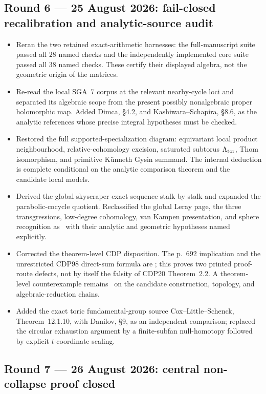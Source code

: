 \subsection*{Round 6 --- 25 August 2026: fail-closed recalibration and
analytic-source audit}

\begin{itemize}[leftmargin=1.8em]
\item Reran the two retained exact-arithmetic harnesses: the
full-manuscript suite passed all $28$ named checks and the independently
implemented core suite passed all $38$ named checks.  These certify their
displayed algebra, not the geometric origin of the matrices.
\item Re-read the local SGA~7 corpus at the relevant nearby-cycle loci and
separated its algebraic scope from the present possibly nonalgebraic proper
holomorphic map.  Added Dimca, \S4.2, and Kashiwara--Schapira, \S8.6, as the
analytic references whose precise integral hypotheses must be checked.
\item Restored the full supported-specialization diagram: equivariant local
product neighbourhood, relative-cohomology excision, saturated subtorus
$\Lambda_{\rm tor}$, Thom isomorphism, and primitive K\"unneth Gysin
summand.  The internal deduction is complete conditional on the analytic
comparison theorem and the candidate local models.
\item Derived the global skyscraper exact sequence stalk by stalk and
expanded the parabolic-cocycle quotient.  Reclassified the global Leray page,
the three transgressions, low-degree cohomology, van Kampen presentation,
and sphere recognition as \Conditional\ with their analytic and geometric
hypotheses named explicitly.
\item Corrected the theorem-level CDP disposition.  The p.~692 implication
and the unrestricted CDP98 direct-sum formula are \Refuted; this proves two
printed proof-route defects, not by itself the falsity of CDP20
Theorem~2.2.  A theorem-level counterexample remains \Conditional\ on the
candidate construction, topology, and algebraic-reduction chains.
\item Added the exact toric fundamental-group source
Cox--Little--Schenck, Theorem~12.1.10, with Danilov, \S9, as an independent
comparison; replaced the circular exhaustion argument by a finite-subfan
null-homotopy followed by explicit $t$-coordinate scaling.
\end{itemize}

\subsection*{Round 7 --- 26 August 2026: central non-collapse proof closed}

